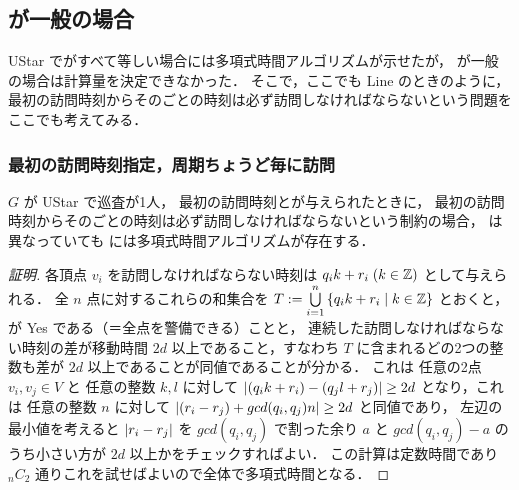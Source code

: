 \subsection{{\timelimit}が一般の場合}

UStar で{\timelimit}がすべて等しい場合には多項式時間アルゴリズムが示せたが，
{\timelimit}が一般の場合は計算量を決定できなかった．%
そこで，ここでも
Line のときのように，
最初の訪問時刻からその{\period}ごとの時刻は必ず訪問しなければならないという問題をここでも考えてみる．


\subsubsection{最初の訪問時刻指定，周期ちょうど毎に訪問}



\begin{theo}
	\label{theo:4_UStar_single_exact_starttime}
	$G$ が UStar で巡査が1人，
	最初の訪問時刻と{\period}が与えられたときに，
	最初の訪問時刻からその{\period}ごとの時刻は必ず訪問しなければならないという制約の場合，
	{\period}は異なっていても
	\decisionpp には多項式時間アルゴリズムが存在する．
\end{theo}

\begin{proof}[証明]
	各頂点 $v_i$ を訪問しなければならない時刻は $q_i k + r_i \; (k \in \mathbb{Z})$ として与えられる．
	全 $n$ 点に対するこれらの和集合を
	$T := \bigcup\limits_{i = 1}^n \left\{{q_i k + r_i }\;\middle|\;{ k \in \mathbb{Z} }\right\}$ 
	とおくと，
	\decisionpp が Yes である（＝全点を警備できる）ことと，
	連続した訪問しなければならない時刻の差が移動時間 $2d$ 以上であること，すなわち
	$T$ に含まれるどの2つの整数も差が $2d$ 以上であることが同値であることが分かる．
	これは
	任意の2点 $v_i, v_j \in V$ と
	任意の整数 $k,l$ に対して $|{ (q_i k + r_i ) - (q_j l + r_j) }| \geq 2d$
	となり，これは
	任意の整数 $n$ に対して $|{ (r_i - r_j) + gcd(q_i, q_j) n }| \geq 2d$
	と同値であり，
	左辺の最小値を考えると
	$|{ r_i - r_j }|$ を $gcd(q_i, q_j)$ で割った余り $a$ と
	$gcd(q_i, q_j) - a$ のうち小さい方が $2d$ 以上かをチェックすればよい．
	この計算は定数時間であり
	${}_n C_2$ 通りこれを試せばよいので全体で多項式時間となる．
\end{proof}

